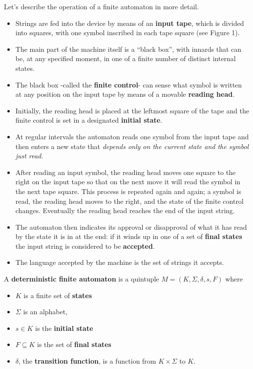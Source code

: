 \begin{multicols}{2}
\setlength{\columnsep}{1.5cm}
\setlength{\columnseprule}{0.2pt}
  Let's describe the operation of a finite automaton in more detail. 
  \begin{itemize}
    \item Strings are fed into the device by means of an \textbf{input tape}, which is divided into squares, with one symbol inscribed in each tape square (see Figure 1).
    \item The main part of the machine itself is a ``black box'', with innards that can be, at any specified moment, in one of a finite number of distinct internal states.
    \item The black box -called the \textbf{finite control}- can sense what symbol is written at any position on the input tape by means of a movable \textbf{reading head}.
    \item Initially, the reading head is placed at the leftmost square of the tape and the finite control is set in a designated \textbf{initial state}.
    \item At regular intervals the automaton reads one symbol from the input tape and then enters a new state that \textit{depends only on the current state and the symbol just read}.
    \item After reading an input symbol, the reading head moves one square to the right on the input tape so that on the next move it will read the symbol in the next tape square. This process is repeated again and again; a symbol is read, the reading head moves to the right, and the state of the finite control changes. Eventually the reading head reaches the end of the input string.
    \item The automaton then indicates its approval or disapproval of what
    it has read by the state it is in at the end: if it winds up in one of a set of \textbf{final states} the input string is considered to be \textbf{accepted}.
    \item The language accepted by the machine is the set of strings it accepts.
  \end{itemize}
\end{multicols}

\begin{definition}{}
  A \textbf{deterministic finite automaton} is a quintuple $M = (K, \Sigma, \delta, s, F)$ where
  \begin{itemize}
    \item $K$ is a finite set of \textbf{states}
    \item $\Sigma$ is an alphabet,
    \item $s \in K$ is the \textbf{initial state}
    \item $F \subseteq K$ is the set of \textbf{final states}
    \item $\delta$, the \textbf{transition function}, is a function from $K \times \Sigma$ to $K$. 
  \end{itemize}
\end{definition}

